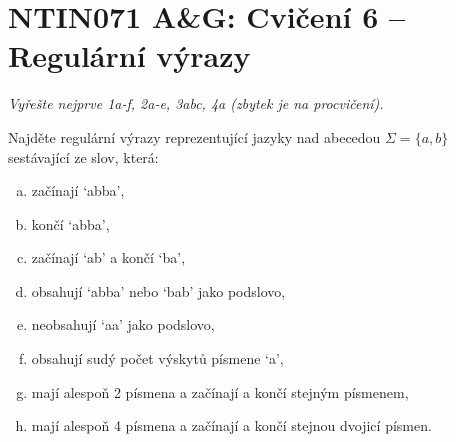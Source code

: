 \documentclass[a4paper,12pt]{amsart}
\begin{document}

\section*{NTIN071 A\&G: Cvičení 6 -- Regulární výrazy}


\medskip

\noindent\emph{Vyřešte nejprve 1a-f, 2a-e, 3abc, 4a (zbytek je na procvičení).}

\medskip

\medskip\begin{problem}

    Najděte regulární výrazy reprezentující jazyky nad abecedou $\Sigma = \{a, b\}$ sestávající ze slov, která:

    \medskip
    
    \begin{multicols}{2}
    
        \begin{enumerate}[(a)]\setlength\itemsep{12pt}
            \item začínají `abba',
            \item končí  `abba',
            \item začínají `ab' a končí `ba',
            \item obsahují `abba' nebo `bab' jako podslovo,
            \item neobsahují `aa' jako podslovo,
            \item obsahují sudý počet výskytů písmene `a',
            \item mají alespoň 2 písmena a začínají a končí stejným písmenem,
            \item mají alespoň 4 písmena a začínají a končí stejnou dvojicí písmen.
        \end{enumerate}

    \end{multicols}

\end{problem}
    
\end{document}
